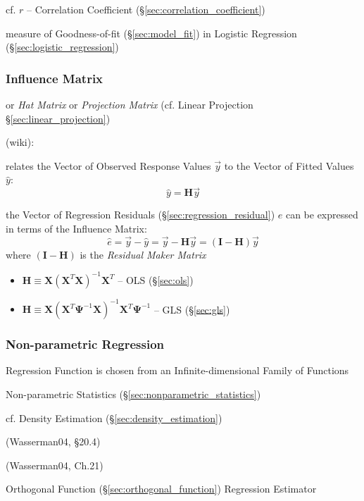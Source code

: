 cf. $r$ -- Correlation Coefficient (\S\ref{sec:correlation_coefficient})

measure of Goodness-of-fit (\S\ref{sec:model_fit}) in Logistic Regression
(\S\ref{sec:logistic_regression})



\subsubsection{Influence Matrix}\label{sec:influence_matrix}

or \emph{Hat Matrix} or \emph{Projection Matrix} (cf.
Linear Projection \S\ref{sec:linear_projection})

(wiki):

relates the Vector of Observed Response Values $\vec{y}$ to the Vector of Fitted
Values $\hat{y}$:
\[
  \hat{y} = \mathbf{H}\vec{y}
\]

the Vector of Regression Residuals (\S\ref{sec:regression_residual}) $\hat{e}$
can be expressed in terms of the Influence Matrix:
\[
  \hat{e} = \vec{y} - \hat{y} = \vec{y} - \mathbf{H}\vec{y} =
    (\mathbf{I} - \mathbf{H})\vec{y}
\]
where $(\mathbf{I} - \mathbf{H})$ is the \emph{Residual Maker Matrix}

\begin{itemize}
  \item $\mathbf{H} \equiv \mathbf{X}(\mathbf{X}^T\mathbf{X})^{-1}\mathbf{X}^T$
    -- OLS (\S\ref{sec:ols})
  \item $\mathbf{H} \equiv \mathbf{X}
    (\mathbf{X}^T\mathbf{\Psi}^{-1}\mathbf{X})^{-1}
    \mathbf{X}^T\mathbf{\Psi}^{-1}$
    -- GLS (\S\ref{sec:gls})
\end{itemize}



\subsubsection{Non-parametric Regression}\label{sec:nonparametric_regression}

Regression Function is chosen from an Infinite-dimensional Family of Functions

Non-parametric Statistics (\S\ref{sec:nonparametric_statistics})

\fist cf. Density Estimation (\S\ref{sec:density_estimation})

(Wasserman04, \S20.4)

(Wasserman04, Ch.21)

Orthogonal Function (\S\ref{sec:orthogonal_function}) Regression Estimator

